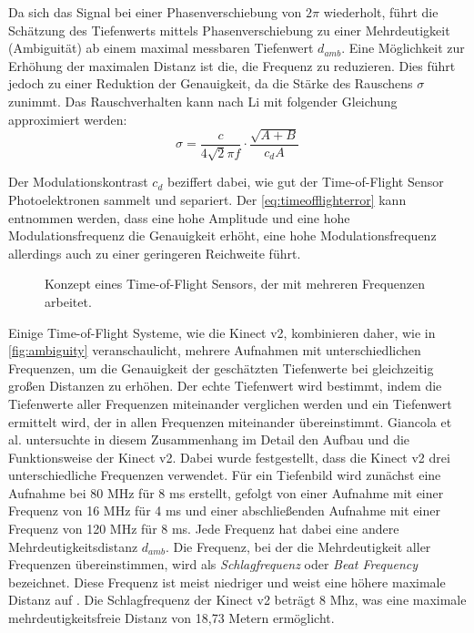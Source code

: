 \documentclass[thesis.tex]{subfiles}
\begin{document}
Da sich das Signal bei einer Phasenverschiebung von $2 \pi$ wiederholt, führt die Schätzung des Tiefenwerts mittels Phasenverschiebung zu einer Mehrdeutigkeit (Ambiguität) ab einem maximal messbaren Tiefenwert $d_{amb}$. Eine Möglichkeit zur Erhöhung der maximalen Distanz ist die, die Frequenz zu reduzieren. Dies führt jedoch zu einer Reduktion der Genauigkeit, da die Stärke des Rauschens $\sigma$ zunimmt. Das Rauschverhalten kann nach Li \cite{bib:Li2014} mit folgender Gleichung approximiert werden: 
\begin{equation}\sigma = \frac{c}{4 \sqrt{2} \pi f} \cdot \frac{\sqrt{A+B}}{c_dA}\label{eq:timeofflighterror}\end{equation}

Der Modulationskontrast $c_d$ beziffert dabei, wie gut der Time-of-Flight Sensor Photoelektronen sammelt und separiert. Der \autoref{eq:timeofflighterror} kann entnommen werden, dass eine hohe Amplitude und eine hohe Modulationsfrequenz die Genauigkeit erhöht, eine hohe Modulationsfrequenz allerdings auch zu einer geringeren Reichweite führt.

\begin{figure}[ht]
    \centering
    \caption{Konzept eines Time-of-Flight Sensors, der mit mehreren Frequenzen arbeitet.}
    \label{fig:ambiguity}
\end{figure}

Einige Time-of-Flight Systeme, wie die Kinect v2, kombinieren daher, wie in \autoref{fig:ambiguity} veranschaulicht, mehrere Aufnahmen mit unterschiedlichen Frequenzen, um die Genauigkeit der geschätzten Tiefenwerte bei gleichzeitig großen Distanzen zu erhöhen. Der echte Tiefenwert wird bestimmt, indem die Tiefenwerte aller Frequenzen miteinander verglichen werden und ein Tiefenwert ermittelt wird, der in allen Frequenzen miteinander übereinstimmt. Giancola et al. \cite{bib:Giancola2018} untersuchte in diesem Zusammenhang im Detail den Aufbau und die Funktionsweise der Kinect v2. Dabei wurde festgestellt, dass die Kinect v2 drei unterschiedliche Frequenzen verwendet. Für ein Tiefenbild wird zunächst eine Aufnahme bei 80 MHz für 8 ms erstellt, gefolgt von einer Aufnahme mit einer Frequenz von 16 MHz für 4 ms und einer abschließenden Aufnahme mit einer Frequenz von 120 MHz für 8 ms. Jede Frequenz hat dabei eine andere Mehrdeutigkeitsdistanz $d_{amb}$. Die Frequenz, bei der die Mehrdeutigkeit aller Frequenzen übereinstimmen, wird als \emph{Schlagfrequenz} oder \emph{Beat Frequency} bezeichnet. Diese Frequenz ist meist niedriger und weist eine höhere maximale Distanz auf \cite{bib:Li2014}. Die Schlagfrequenz der Kinect v2 beträgt 8 Mhz, was eine maximale mehrdeutigkeitsfreie Distanz von 18,73 Metern ermöglicht.
\end{document}
